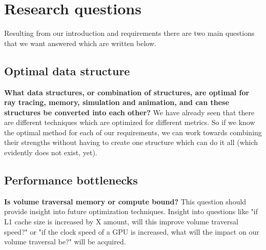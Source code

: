 \section{Research questions}\label{research_questions}
Resulting from our introduction and requirements there are two main questions that we want answered which are written below.

\subsection{Optimal data structure}\label{research_questions:optimal_data_structure}

\noindent\textbf{What data structures, or combination of structures, are optimal for ray tracing, memory, simulation and animation, and can these structures be converted into each other?} We have already seen that there are different techniques which are optimized for different metrics. So if we know the optimal method for each of our requirements, we can work towards combining their strengths without having to create one structure which can do it all (which evidently does not exist, yet).

\subsection{Performance bottlenecks}\label{research_questions:performance_bottlenecks}
\noindent\textbf{Is volume traversal memory or compute bound?} This question should provide insight into future optimization techniques. Insight into questions like "if L1 cache size is increased by X amount, will this improve volume traversal speed?" or "if the clock speed of a GPU is increased, what will the impact on our volume traversal be?" will be acquired.
